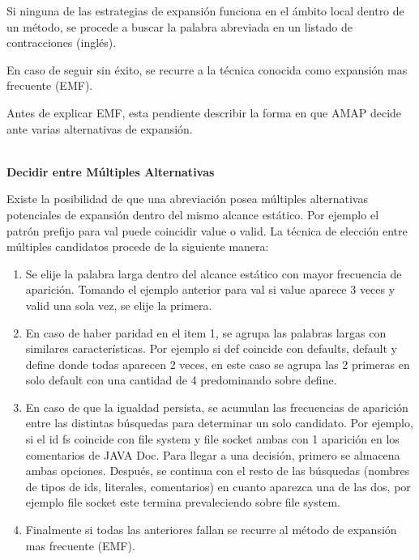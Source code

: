 \documentclass[a4paper,12pt]{report}
\begin{document}
Si ninguna de las estrategias de expansión funciona en el ámbito local dentro de un método, se procede a buscar la palabra abreviada en un listado de contracciones (inglés).

En caso de seguir sin éxito, se recurre a la técnica conocida como expansión mas frecuente (EMF). 

Antes de explicar EMF, esta pendiente describir la forma en que AMAP decide ante varias alternativas de expansión.

\noindent \textbf{\\Decidir entre Múltiples Alternativas\\}

Existe la posibilidad de que una abreviación posea múltiples alternativas potenciales de expansión dentro del mismo alcance estático. Por ejemplo el patrón prefijo para \textsf{val} puede coincidir \textsf{value} o \textsf{valid}. La técnica de elección entre múltiples candidatos procede de la siguiente manera:

\begin{enumerate}
\itemsep0em%
\item Se elije la palabra larga dentro del alcance estático con mayor frecuencia de aparición. Tomando el ejemplo anterior para \textsf{val} si \textsf{value} aparece 3 veces y \textsf{valid} una sola vez, se elije la primera.

\item En caso de haber paridad en el item 1, se agrupa las palabras largas con similares características. Por ejemplo si \textsf{def} coincide con \textsf{defaults}, \textsf{default} y \textsf{define} donde todas aparecen 2 veces, en este caso se agrupa las 2 primeras en solo \textsf{default} con una cantidad de 4 predominando sobre \textsf{define}.

\item En caso de que la igualdad persista, se acumulan las frecuencias de aparición entre las distintas búsquedas para determinar un solo candidato. Por ejemplo, si el id \textsf{fs} coincide con \textsf{file system} y \textsf{file socket} ambas con 1 aparición en los comentarios de JAVA Doc. Para llegar a una decisión, primero se almacena ambas opciones. Después, se continua con el resto de las búsquedas (nombres de tipos de ids, literales, comentarios) en cuanto aparezca una de las dos, por ejemplo \textsf{file socket} este termina prevaleciendo sobre \textsf{file system}.

\item Finalmente si todas las anteriores fallan se recurre al método de expansión mas frecuente (EMF). 

\end{enumerate}
\end{document}
